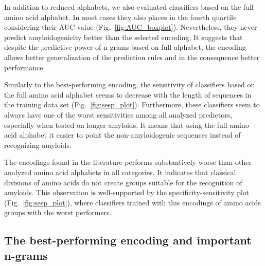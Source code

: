 \documentclass{bioinfo}
\begin{document}
  In addition to reduced alphabets, we also evaluated classifiers based on the 
full amino acid alphabet. In most cases they also places in the fourth quartile 
considering their AUC value (Fig.~\ref{fig:AUC_boxplot}). Nevertheless, they 
never predict amyloidogenicity better than the selected encoding. It suggests 
that despite the predictive power of n-grams based on full alphabet, the 
encoding allows better generalization of the prediction rules and in the 
consequence better performance.

  Similarly to the best-performing encoding, the sensitivity of classifiers 
based on the full amino acid alphabet seems to decrease with the length of 
sequences in the training data set (Fig.~\ref{fig:sesp_plot}). Furthermore, 
these classifiers seem to always have one of the worst sensitivities among all 
analyzed predictors, especially when tested on longer amyloids. It means that 
using the full amino acid alphabet it easier to point the non-amyloidogenic 
sequences instead of recognizing amyloids.

  The encodings found in the literature performs substantively worse than other 
analyzed amino acid alphabets in all categories. It indicates that classical 
divisions of amino acids do not create groups suitable for the recognition of 
amyloids. This observation is well-supported by the specificity-sensitivity 
plot (Fig.~\ref{fig:sesp_plot}), where classifiers trained with this encodings 
of amino acids groups with the worst performers.

\subsection{The best-performing encoding and important n-grams}
\end{document}
